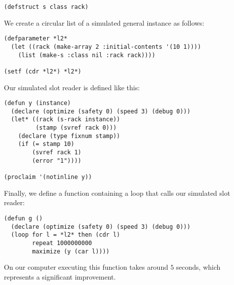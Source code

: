 \begin{verbatim}
(defstruct s class rack)
\end{verbatim}

We create a circular list of a simulated general instance as follows:

\begin{verbatim}
(defparameter *l2* 
  (let ((rack (make-array 2 :initial-contents '(10 1))))
    (list (make-s :class nil :rack rack))))

(setf (cdr *l2*) *l2*)
\end{verbatim}

Our simulated slot reader is defined like this:

\begin{verbatim}
(defun y (instance)
  (declare (optimize (safety 0) (speed 3) (debug 0)))
  (let* ((rack (s-rack instance))
         (stamp (svref rack 0)))
    (declare (type fixnum stamp))
    (if (= stamp 10)
        (svref rack 1)
        (error "1"))))

(proclaim '(notinline y))
\end{verbatim}

Finally, we define a function containing a loop that calls our
simulated slot reader:

\begin{verbatim}
(defun g ()
  (declare (optimize (safety 0) (speed 3) (debug 0)))
  (loop for l = *l2* then (cdr l)
        repeat 1000000000
        maximize (y (car l))))
\end{verbatim}

On our computer executing this function takes around $5$ seconds,
which represents a significant improvement.
